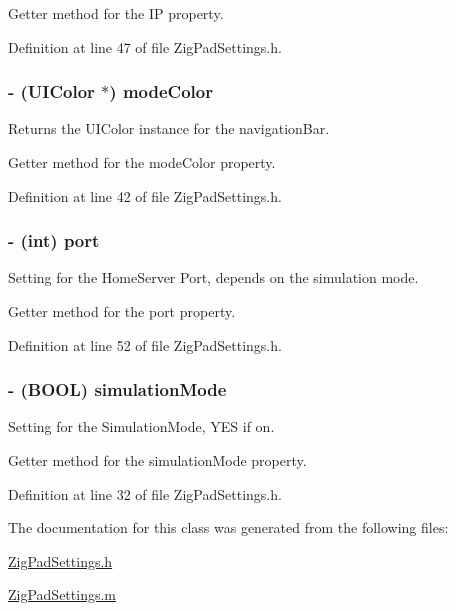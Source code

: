 Getter method for the IP property. 

Definition at line 47 of file ZigPadSettings.h.

\hypertarget{interface_zig_pad_settings_a22b7a43d44d562d77d8534e46db89fe1}{
\subsubsection[{modeColor}]{\setlength{\rightskip}{0pt plus 5cm}-\/ (UIColor $\ast$) modeColor}}
\label{interface_zig_pad_settings_a22b7a43d44d562d77d8534e46db89fe1}
Returns the UIColor instance for the navigationBar.

Getter method for the modeColor property. 

Definition at line 42 of file ZigPadSettings.h.

\hypertarget{interface_zig_pad_settings_a63c89c04d1feae07ca35558055155ffb}{
\subsubsection[{port}]{\setlength{\rightskip}{0pt plus 5cm}-\/ (int) port}}
\label{interface_zig_pad_settings_a63c89c04d1feae07ca35558055155ffb}
Setting for the HomeServer Port, depends on the simulation mode.

Getter method for the port property. 

Definition at line 52 of file ZigPadSettings.h.

\hypertarget{interface_zig_pad_settings_ab314ed8d97474bb5391236ced665bd3b}{
\subsubsection[{simulationMode}]{\setlength{\rightskip}{0pt plus 5cm}-\/ (BOOL) simulationMode}}
\label{interface_zig_pad_settings_ab314ed8d97474bb5391236ced665bd3b}
Setting for the SimulationMode, YES if on.

Getter method for the simulationMode property. 

Definition at line 32 of file ZigPadSettings.h.



The documentation for this class was generated from the following files:\begin{DoxyCompactItemize}
\item 
\hyperlink{_zig_pad_settings_8h}{ZigPadSettings.h}\item 
\hyperlink{_zig_pad_settings_8m}{ZigPadSettings.m}\end{DoxyCompactItemize}

